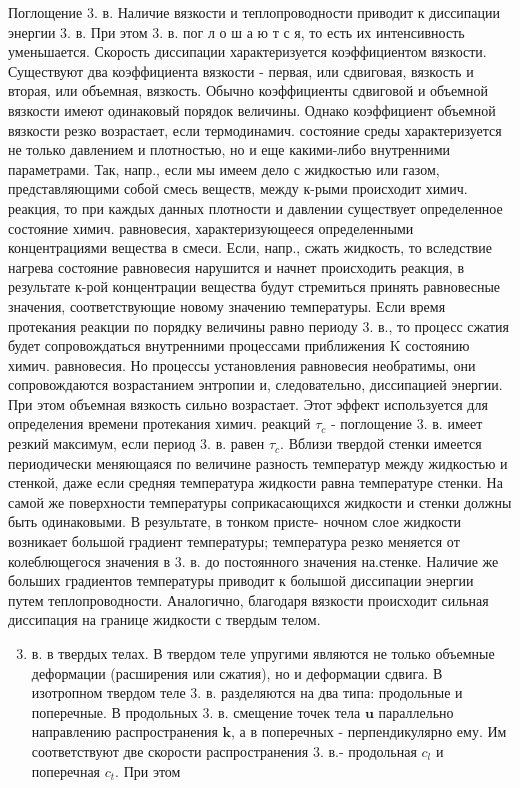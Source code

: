 \documentclass[10pt]{article}
\begin{document}
Поглощение 3. в. Наличие вязкости и теплопроводности приводит к диссипации энергии 3. в. При этом 3. в. пог л о ш а ю т с я, то есть их интенсивность уменьшается. Скорость диссипации характеризуется коэффициентом вязкости. Существуют два коэффициента вязкости - первая, или сдвиговая, вязкость и вторая, или объемная, вязкость. Обычно коэффициенты сдвиговой и объемной вязкости имеют одинаковый порядок величины. Однако коэффициент объемной вязкости резко возрастает, если термодинамич. состояние среды характеризуется не только давлением и плотностью, но и еще какими-либо внутренними параметрами. Так, напр., если мы имеем дело с жидкостью или газом, представляющими собой смесь веществ, между к-рыми происходит химич. реакция, то при каждых данных плотности и давлении существует определенное состояние химич. равновесия, характеризующееся определенными концентрациями вещества в смеси. Если, напр., сжать жидкость, то вследствие нагрева состояние равновесия нарушится и начнет происходить реакция, в результате к-рой концентрации вещества будут стремиться принять равновесные значения, соответствующие новому значению температуры. Если время протекания реакции по порядку величины равно периоду 3. в., то процесс сжатия будет сопровождаться внутренними процессами приближения $\mathrm{K}$ состоянию химич. равновесия. Но процессы установления равновесия необратимы, они сопровождаются возрастанием энтропии и, следовательно, диссипацией энергии. При этом объемная вязкость сильно возрастает. Этот эффект используется для определения времени протекания химич. реакций $\tau_{c}$ - поглощение 3. в. имеет резкий максимум, если период 3. в. равен $\tau_{c}$. Вблизи твердой стенки имеется периодически меняющаяся по величине разность температур между жидкостью и стенкой, даже если средняя температура жидкости равна температуре стенки. На самой же поверхности температуры соприкасающихся жидкости и стенки должны быть одинаковыми. В результате, в тонком присте- ночном слое жидкости возникает большой градиент температуры; температура резко меняется от колеблющегося значения в 3. в. до постоянного значения на.стенке. Наличие же больших градиентов температуры приводит к болышой диссипации энергии путем теплопроводности. Аналогично, благодаря вязкости происходит сильная диссипация на границе жидкости с твердым телом.



\begin{enumerate}

  \setcounter{enumi}{2}

  \item в. в твердых телах. В твердом теле упругими являются не только объемные деформации (расширения или сжатия), но и деформации сдвига. В изотропном твердом теле 3. в. разделяются на два типа: продольные и поперечные. В продольных 3. в. смещение точек тела $\boldsymbol{u}$ параллельно направлению распространения $\boldsymbol{k}$, а в поперечных - перпендикулярно ему. Им соответствуют две скорости распространения 3. в.- продольная $c_{l}$ и поперечная $c_{t}$. При этом

\end{enumerate}
\end{document}
